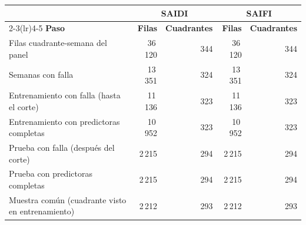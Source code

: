 \begin{tabular}{p{} r r r r}
\toprule
& \multicolumn{2}{c}{\textbf{SAIDI}} & \multicolumn{2}{c}{\textbf{SAIFI}} \\
\cmidrule(lr){2-3}\cmidrule(lr){4-5}
\textbf{Paso} & \textbf{Filas} & \textbf{Cuadrantes} & \textbf{Filas} & \textbf{Cuadrantes} \\
\midrule
Filas cuadrante-semana del panel & 36\,120 & 344 & 36\,120 & 344 \\
Semanas con falla & 13\,351 & 324 & 13\,351 & 324 \\
Entrenamiento con falla (hasta el corte) & 11\,136 & 323 & 11\,136 & 323 \\
Entrenamiento con predictoras completas & 10\,952 & 323 & 10\,952 & 323 \\
Prueba con falla (después del corte) & 2\,215 & 294 & 2\,215 & 294 \\
Prueba con predictoras completas & 2\,215 & 294 & 2\,215 & 294 \\
Muestra común (cuadrante visto en entrenamiento) & 2\,212 & 293 & 2\,212 & 293 \\
\bottomrule
\end{tabular}
